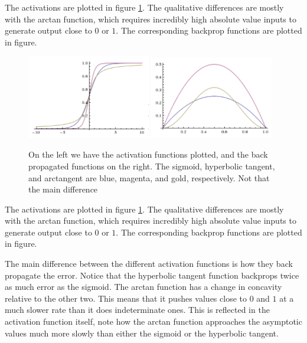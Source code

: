 \documentclass[prl,amsmath,amssymb,floatfix,superscriptaddress,notitlepage,twocolumn]{revtex4}
\begin{document}
The activations are plotted in figure \ref{AF}. The qualitative differences are mostly with the arctan function, which requires incredibly high absolute value inputs to generate output close to $0$ or $1$. The corresponding backprop functions are plotted in figure.

\begin{figure}[ht!]
\label{AF}
\centering
\includegraphics[width=0.48\textwidth]{ActivationFunctions.png}\hfill
\includegraphics[width=0.48\textwidth]{BackPropActivationFunctions.png}
\caption{On the left we have the activation functions plotted, and the back propagated functions on the right. The sigmoid, hyperbolic tangent, and arctangent are blue, magenta, and gold, respectively. Not that the main difference }
\end{figure}

The activations are plotted in figure \ref{AF}. The qualitative differences are mostly with the arctan function, which requires incredibly high absolute value inputs to generate output close to $0$ or $1$. The corresponding backprop functions are plotted in figure.

The main difference between the different activation functions is how they back propagate the error. Notice that the hyperbolic tangent function backprops twice as much error as the sigmoid. The arctan function has a change in concavity relative to the other two. This means that it pushes values close to $0$ and $1$ at a much slower rate than it does indeterminate ones. This is reflected in the activation function itself, note how the arctan function approaches the asymptotic values much more slowly than either the sigmoid or the hyperbolic tangent. 
\end{document}
